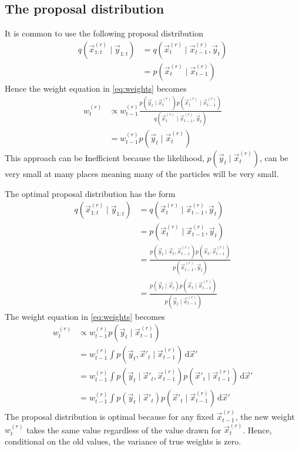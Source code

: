 \subsection{The proposal distribution}
    It is common to use the following proposal distribution
    \begin{align}
        q(\vec x_{1:t}^{(r)} \mid \vec y_{1:t})     &= q(\vec x_t^{(r)} \mid \vec x_{t - 1}^{(r)}, \vec y_t) \\
                                                    &= p(\vec x_t^{(r)} \mid \vec x_{t - 1}^{(r)})
    \end{align}
    Hence the weight equation in \eqref{eq:weights} becomes
    \begin{align}
        w_t^{(r)}   &\propto w_{t - 1}^{(r)} \frac{p\left(\vec y_t \mid \vec x_t^{(r)}\right) p\left(\vec x_t^{(r)} \mid \vec x_{t - 1}^{(r)}\right)}{q\left(\vec x_t^{(r)} \mid \vec x_{t - 1}^{(r)}, \vec y_t\right)} \\
                    &= w_{t - 1}^{(r)} p\left(\vec y_t \mid \vec x_t^{(r)}\right)
    \end{align}
    This approach can be \textbf inefficient because the likelihood, $p\left(\vec y_t \mid \vec x_t^{(r)}\right)$, can be very small at many places meaning many of the particles will be very small.

    The optimal proposal distribution has the form
    \begin{align}
        q(\vec x_{1:t}^{(r)} \mid \vec y_{1:t})     &= q(\vec x_t^{(r)} \mid \vec x_{t - 1}^{(r)}, \vec y_t) \\
                                                    &= p(\vec x_t^{(r)} \mid \vec x_{t - 1}^{(r)}, \vec y_t) \\
                                                    &= \frac{p(\vec y_t \mid \vec x_t, \vec x_{t-1}^{(r)}) p(\vec x_t, \vec x_{t-1}^{(r)})}{p(\vec x_{t-1}^{(r)}, \vec y_t)} \\
                                                    &= \frac{p(\vec y_t \mid \vec x_t) p(\vec x_t \mid \vec x_{t-1}^{(r)})}{p(\vec y_t \mid \vec x_{t-1}^{(r)})}
    \end{align}
    The weight equation in \eqref{eq:weights} becomes
    \begin{align}
        w_t^{(r)}   &\propto w_{t - 1}^{(r)} p\left(\vec y_t \mid \vec x_{t-1}^{(r)}\right) \\
                    &= w_{t - 1}^{(r)} \int{p(\vec y_t, \vec x'_t \mid \vec x_{t-1}^{(r)}) \,\mathrm d\vec x'} \\
                    &= w_{t - 1}^{(r)} \int{p(\vec y_t \mid \vec x'_t, \vec x_{t-1}^{(r)}) p(\vec x'_t \mid \vec x_{t-1}^{(r)}) \,\mathrm d\vec x'} \\
                    &= w_{t - 1}^{(r)} \int{p(\vec y_t \mid \vec x'_t) p(\vec x'_t \mid \vec x_{t-1}^{(r)}) \,\mathrm d\vec x'}
    \end{align}
    The proposal distribution is optimal because for any fixed $\vec x_{t-1}^{(r)}$, the new weight $w_t^{(r)}$ takes the same value regardless of the value drawn for $\vec x_t^{(r)}$. Hence, conditional on the old values, the variance of true weights is zero.